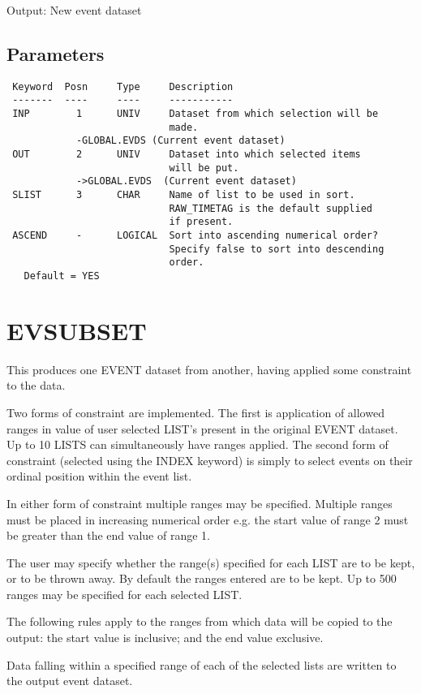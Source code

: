 \documentclass{book}
\renewcommand{\_}{{\tt\char'137}}     %
\begin{document}
Output: New event dataset

\subsection{Parameters}
\begin{verbatim}
 Keyword  Posn     Type     Description
 -------  ----     ----     -----------
 INP        1      UNIV     Dataset from which selection will be
                            made.
            -GLOBAL.EVDS (Current event dataset)
 OUT        2      UNIV     Dataset into which selected items
                            will be put.
            ->GLOBAL.EVDS  (Current event dataset)
 SLIST      3      CHAR     Name of list to be used in sort.
                            RAW_TIMETAG is the default supplied
                            if present.
 ASCEND     -      LOGICAL  Sort into ascending numerical order?
                            Specify false to sort into descending
                            order.
   Default = YES

\end{verbatim}\section{EVSUBSET}
This produces one EVENT dataset from another, having applied some
constraint to the data.

Two forms of constraint are implemented. The first is application
of allowed ranges in value of user selected LIST's present in the
original EVENT dataset. Up to 10 LISTS can simultaneously have
ranges applied. The second form of constraint (selected using the
INDEX keyword) is simply to select events on their ordinal position
within the event list.

In either form of constraint multiple ranges may be specified.
Multiple ranges must be placed in increasing numerical order e.g.
the start value of range 2 must be greater than the end value of
range 1.

The user may specify whether the range(s) specified for each
LIST are to be kept, or to be thrown away. By default the
ranges entered are to be kept. Up to 500 ranges may be specified
for each selected LIST.

The following rules apply to the ranges from which data will be
copied to the output: the start value is inclusive; and the end
value exclusive.

Data falling within a specified range of each of the selected
lists are written to the output event dataset.
\end{document}
